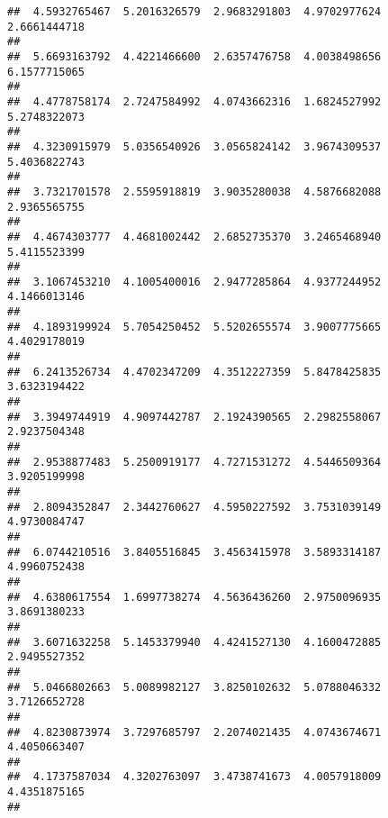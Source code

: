 \documentclass[]{article}
\begin{document}
\begin{verbatim}
##  4.5932765467  5.2016326579  2.9683291803  4.9702977624  2.6661444718 
##                                                                       
##  5.6693163792  4.4221466600  2.6357476758  4.0038498656  6.1577715065 
##                                                                       
##  4.4778758174  2.7247584992  4.0743662316  1.6824527992  5.2748322073 
##                                                                       
##  4.3230915979  5.0356540926  3.0565824142  3.9674309537  5.4036822743 
##                                                                       
##  3.7321701578  2.5595918819  3.9035280038  4.5876682088  2.9365565755 
##                                                                       
##  4.4674303777  4.4681002442  2.6852735370  3.2465468940  5.4115523399 
##                                                                       
##  3.1067453210  4.1005400016  2.9477285864  4.9377244952  4.1466013146 
##                                                                       
##  4.1893199924  5.7054250452  5.5202655574  3.9007775665  4.4029178019 
##                                                                       
##  6.2413526734  4.4702347209  4.3512227359  5.8478425835  3.6323194422 
##                                                                       
##  3.3949744919  4.9097442787  2.1924390565  2.2982558067  2.9237504348 
##                                                                       
##  2.9538877483  5.2500919177  4.7271531272  4.5446509364  3.9205199998 
##                                                                       
##  2.8094352847  2.3442760627  4.5950227592  3.7531039149  4.9730084747 
##                                                                       
##  6.0744210516  3.8405516845  3.4563415978  3.5893314187  4.9960752438 
##                                                                       
##  4.6380617554  1.6997738274  4.5636436260  2.9750096935  3.8691380233 
##                                                                       
##  3.6071632258  5.1453379940  4.4241527130  4.1600472885  2.9495527352 
##                                                                       
##  5.0466802663  5.0089982127  3.8250102632  5.0788046332  3.7126652728 
##                                                                       
##  4.8230873974  3.7297685797  2.2074021435  4.0743674671  4.4050663407 
##                                                                       
##  4.1737587034  4.3202763097  3.4738741673  4.0057918009  4.4351875165 
##                                                                       

\end{verbatim}
\end{document}
